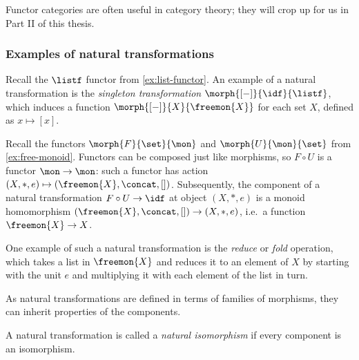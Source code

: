 Functor categories are often useful in category theory; they will crop up for us
in Part II of this thesis.

\subsubsection{Examples of natural transformations}

\begin{example}[Singleton]
    Recall the \(\listf\) functor from \cref{ex:list-functor}.
    An example of a natural transformation is the
    \emph{singleton transformation} \(\morph{[-]}{\idf}{\listf}\), which
    induces a function \(\morph{[-]}{X}{\freemon{X}}\) for each set \(X\),
    defined as \(x \mapsto [x]\).
\end{example}

\begin{example}[Reduce]
    Recall the functors \(\morph{F}{\set}{\mon}\) and \(\morph{U}{\mon}{\set}\)
    from \cref{ex:free-monoid}.
    Functors can be composed just like morphisms, so \(F \circ U\) is a
    functor \(\mon \to \mon\): such a functor has action \(
    (X, *, e) \mapsto (\freemon{X}, \concat, [])
    \).
    Subsequently, the component of a natural transformation \(
    F \circ U \to \idf
    \) at object \((X, *, e)\) is a monoid homomorphism \(
    (\freemon{X}, \concat, []) \to (X, *, e)
    \), i.e.\ a function \(\freemon{X} \to X\).

    One example of such a natural transformation is the \emph{reduce} or
    \emph{fold} operation, which takes a list in \(\freemon{X}\) and reduces it
    to an element of \(X\) by starting with the unit \(e\) and multiplying it
    with each element of the list in turn.
\end{example}

As natural transformations are defined in terms of families of morphisms, they
can inherit properties of the components.

\begin{definition}
    A natural transformation is called a \emph{natural isomorphism} if every
    component is an isomorphism.
\end{definition}